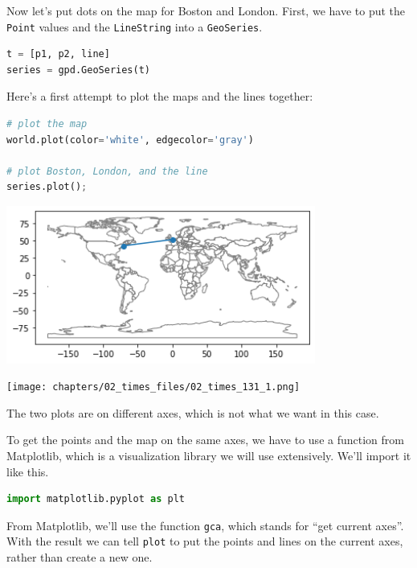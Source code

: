 Now let's put dots on the map for Boston and London. First, we have to
put the \passthrough{\lstinline!Point!} values and the
\passthrough{\lstinline!LineString!} into a
\passthrough{\lstinline!GeoSeries!}.

\begin{lstlisting}[language=Python,style=source]
t = [p1, p2, line]
series = gpd.GeoSeries(t)
\end{lstlisting}

Here's a first attempt to plot the maps and the lines together:

\begin{lstlisting}[language=Python,style=source]
# plot the map
world.plot(color='white', edgecolor='gray')

# plot Boston, London, and the line
series.plot();
\end{lstlisting}

\begin{center}
\includegraphics[width=4in]{chapters/02_times_files/02_times_131_0.png}
\end{center}

\begin{center}
\texttt{[image: chapters/02\_times\_files/02\_times\_131\_1.png]}
\end{center}

The two plots are on different axes, which is not what we want in this
case.

To get the points and the map on the same axes, we have to use a
function from Matplotlib, which is a visualization library we will use
extensively. We'll import it like this.

\begin{lstlisting}[language=Python,style=source]
import matplotlib.pyplot as plt
\end{lstlisting}

From Matplotlib, we'll use the function \passthrough{\lstinline!gca!},
which stands for ``get current axes''. With the result we can tell
\passthrough{\lstinline!plot!} to put the points and lines on the
current axes, rather than create a new one.

